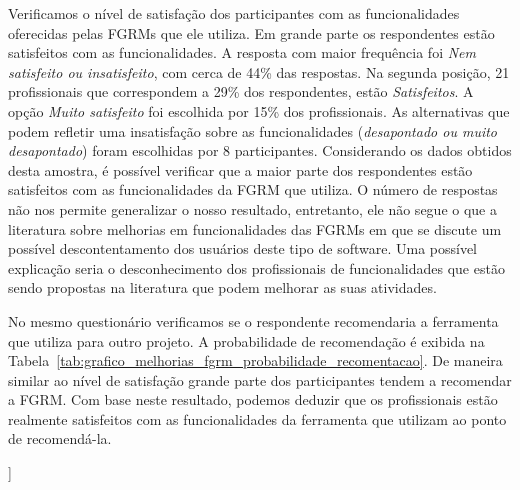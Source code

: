 Verificamos o nível de satisfação dos participantes com as funcionalidades
oferecidas pelas FGRMs que ele utiliza. Em grande parte os respondentes estão
satisfeitos com as funcionalidades. A resposta com maior frequência foi
\textit{Nem satisfeito ou insatisfeito}, com cerca de 44\% das respostas. Na
segunda posição, 21 profissionais que correspondem a 29\% dos respondentes,
estão \textit{Satisfeitos}. A opção \textit{Muito satisfeito} foi escolhida por
15\% dos profissionais. As alternativas que podem refletir uma insatisfação
sobre as funcionalidades (\textit{desapontado ou muito desapontado}) foram
escolhidas por 8 participantes. Considerando os dados obtidos desta amostra, é
possível verificar que a maior parte dos respondentes estão satisfeitos com as
funcionalidades da FGRM que utiliza. O número de respostas não nos permite
generalizar o nosso resultado, entretanto, ele não segue o que a literatura
sobre melhorias em funcionalidades das FGRMs em que se discute um possível
descontentamento dos usuários deste tipo de software. Uma possível explicação
seria o desconhecimento dos profissionais de funcionalidades que estão sendo
propostas na literatura que podem melhorar as suas atividades.


No mesmo questionário verificamos se o respondente recomendaria a ferramenta
que utiliza para outro projeto. A probabilidade de recomendação é exibida na
Tabela~\ref{tab:grafico_melhorias_fgrm_probabilidade_recomentacao}. De maneira
similar ao nível de satisfação grande parte dos participantes tendem a
recomendar a FGRM\@. Com base neste resultado, podemos deduzir que os
profissionais estão realmente satisfeitos com as funcionalidades da ferramenta
que utilizam ao ponto de recomendá-la.

\begin{table}[htpb]]
\centering
{}
\caption{Probabilidade de Recomendação da Ferramenta Utilizada}
\label{tab:grafico_melhorias_fgrm_probabilidade_recomentacao}
\end{table}

